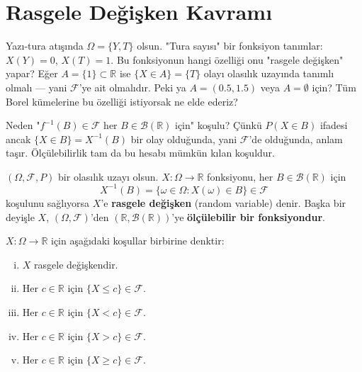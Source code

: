 \section{Rasgele Değişken Kavramı}
\label{sec:rd_kavram}

\begin{kesif}
Yazı-tura atışında $\Omega = \{Y, T\}$ olsun.
"Tura sayısı" bir fonksiyon tanımlar: $X(Y) = 0$, $X(T) = 1$.
Bu fonksiyonun hangi özelliği onu "rasgele değişken" yapar?
Eğer $A = \{1\} \subset \mathbb{R}$ ise $\{X \in A\} = \{T\}$ olayı
olasılık uzayında tanımlı olmalı --- yani $\mathcal{F}$'ye ait olmalıdır.
Peki ya $A = (0.5, 1.5)$ veya $A = \emptyset$ için?
Tüm Borel kümelerine bu özelliği istiyorsak ne elde ederiz?
\end{kesif}

\begin{tanimgerekce}
Neden "$f^{-1}(B) \in \mathcal{F}$ her $B \in \mathcal{B}(\mathbb{R})$ için" koşulu?
Çünkü $P(X \in B)$ ifadesi ancak $\{X \in B\} = X^{-1}(B)$ bir olay olduğunda,
yani $\mathcal{F}$'de olduğunda, anlam taşır.
Ölçülebilirlik tam da bu hesabı mümkün kılan koşuldur.
\end{tanimgerekce}

\begin{tanim}
\label{def:rasgele_degisken}
$(\Omega, \mathcal{F}, P)$ bir olasılık uzayı olsun.
$X : \Omega \to \mathbb{R}$ fonksiyonu, her $B \in \mathcal{B}(\mathbb{R})$ için
\[
  X^{-1}(B) = \{\omega \in \Omega : X(\omega) \in B\} \in \mathcal{F}
\]
koşulunu sağlıyorsa $X$'e \textbf{rasgele değişken} (random variable) denir.
Başka bir deyişle $X$, $(\Omega, \mathcal{F})$'den $(\mathbb{R}, \mathcal{B}(\mathbb{R}))$'ye
\textbf{ölçülebilir bir fonksiyondur}.
\end{tanim}

\begin{onerme}
\label{prop:rd_char}
$X : \Omega \to \mathbb{R}$ için aşağıdaki koşullar birbirine denktir:
\begin{enumerate}[(i)]
  \item $X$ rasgele değişkendir.
  \item Her $c \in \mathbb{R}$ için $\{X \leq c\} \in \mathcal{F}$.
  \item Her $c \in \mathbb{R}$ için $\{X < c\} \in \mathcal{F}$.
  \item Her $c \in \mathbb{R}$ için $\{X > c\} \in \mathcal{F}$.
  \item Her $c \in \mathbb{R}$ için $\{X \geq c\} \in \mathcal{F}$.
\end{enumerate}
\end{onerme}

